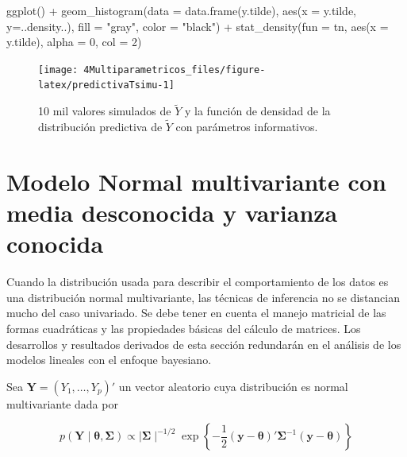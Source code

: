 \documentclass[
  10pt,
  spanish,
]{book}
\newenvironment{Shaded}{\begin{snugshade}}{\end{snugshade}}
\newcommand{\AttributeTok}[1]{\textcolor[rgb]{0.77,0.63,0.00}{#1}}
\newcommand{\DecValTok}[1]{\textcolor[rgb]{0.00,0.00,0.81}{#1}}
\newcommand{\FunctionTok}[1]{\textcolor[rgb]{0.00,0.00,0.00}{#1}}
\newcommand{\NormalTok}[1]{#1}
\newcommand{\SpecialCharTok}[1]{\textcolor[rgb]{0.00,0.00,0.00}{#1}}
\newcommand{\StringTok}[1]{\textcolor[rgb]{0.31,0.60,0.02}{#1}}
\theoremstyle{definition}
\theoremstyle{definition}
\theoremstyle{definition}
\theoremstyle{definition}
\theoremstyle{remark}
\begin{document}
\begin{Shaded}
\begin{Highlighting}[]
\FunctionTok{ggplot}\NormalTok{() }\SpecialCharTok{+} 
  \FunctionTok{geom\_histogram}\NormalTok{(}\AttributeTok{data =} \FunctionTok{data.frame}\NormalTok{(y.tilde),}
                 \FunctionTok{aes}\NormalTok{(}\AttributeTok{x =}\NormalTok{ y.tilde, }\AttributeTok{y=}\NormalTok{..density..),}
                 \AttributeTok{fill =} \StringTok{"gray"}\NormalTok{,}
                 \AttributeTok{color =} \StringTok{"black"}\NormalTok{) }\SpecialCharTok{+}
  \FunctionTok{stat\_density}\NormalTok{(}\AttributeTok{fun =}\NormalTok{ tn, }\FunctionTok{aes}\NormalTok{(}\AttributeTok{x =}\NormalTok{ y.tilde), }\AttributeTok{alpha =} \DecValTok{0}\NormalTok{, }\AttributeTok{col =} \DecValTok{2}\NormalTok{) }
\end{Highlighting}
\end{Shaded}

\begin{figure}

{\centering \texttt{[image: 4Multiparametricos\_files/figure-latex/predictivaTsimu-1]} 

}

\caption{10 mil valores simulados de $\tilde{Y}$ y la función de densidad de la distribución predictiva de $\tilde{Y}$ con parámetros informativos.}\label{fig:predictivaTsimu}
\end{figure}

\hypertarget{modelo-normal-multivariante-con-media-desconocida-y-varianza-conocida}{%
\section{Modelo Normal multivariante con media desconocida y varianza conocida}\label{modelo-normal-multivariante-con-media-desconocida-y-varianza-conocida}}

Cuando la distribución usada para describir el comportamiento de los datos es una distribución normal multivariante, las técnicas de inferencia no se distancian mucho del caso univariado. Se debe tener en cuenta el manejo matricial de las formas cuadráticas y las propiedades básicas del cálculo de matrices. Los desarrollos y resultados derivados de esta sección redundarán en el análisis de los modelos lineales con el enfoque bayesiano.

Sea \(\mathbf{Y}=(Y_1,\ldots,Y_p)'\) un vector aleatorio cuya distribución es normal multivariante dada por

\begin{equation}
p(\mathbf{Y} \mid \boldsymbol \theta,\boldsymbol \Sigma)\propto \mid \boldsymbol \Sigma\mid ^{-1/2}
\exp\left\{-\frac{1}{2}(\mathbf{y}-\boldsymbol \theta)'\boldsymbol \Sigma^{-1}(\mathbf{y}-\boldsymbol \theta)\right\}
\end{equation}
\end{document}
